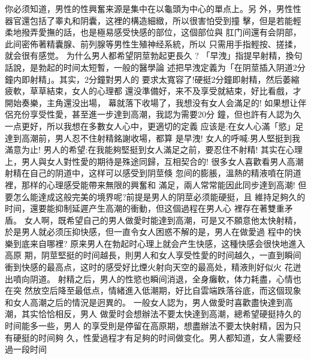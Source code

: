 \documentclass[12pt,UTF8]{ctexbook}
\begin{document}
你必须知道，男性的性興奮来源是集中在以龜頭为中心的單点上。另
外，男性性器官還包括了睾丸和阴囊，这裡的構造細緻，所以很害怕受到撞
擊，但是若能輕柔地撥弄愛撫的話，也是極易感受快感的部位，这個部位與
肛门间還有会阴部，此间密佈著精囊腺、前列腺等男性生殖神经系統，所以
只需用手指輕按、搓揉，就会很有感觉。
为什么男人都希望阴莖勃起更長久 ?
「早洩」指提早射精，換句話說，是勃起的时间太短暫，一般的醫學論
述把早洩定義为「在阴莖插入阴道2分鐘内即射精」。其实，2分鐘對男人的
要求太寬容了!硬挺2分鐘即射精，然后萎縮疲軟，草草結束，女人的心理都
還没準備好，来不及享受就結束，好比看戲，才開始奏樂，主角還没出場，
幕就落下收場了，我想没有女人会滿足的!
如果想让伴侶充份享受性愛，甚至進一步達到高潮，我認为需要20分
鐘，但也許有人認为久一点更好，所以我想在多數女人心中，更適切的定義
应该是:在女人心滿「慾」足達到高潮前，男人忍不住射精銘謝收場，都算
是早洩!
女人的呼喊:男人堅挺到我滿意为止!
男人的希望:在我能夠堅挺到女人滿足之前，要忍住不射精!
其实在心理上，男人與女人對性愛的期待是殊途同歸，互相契合的!
很多女人喜歡看男人高潮射精在自己的阴道中，这样可以感受到阴莖倏
忽间的膨脹，溫熱的精液噴在阴道裡，那样的心理感受能帶来無限的興奮和
滿足，兩人常常能因此同步達到高潮!
但要怎么能達成这般完美的境界呢?前提是男人的阴莖必须能硬挺，且
維持足夠久的时间，還要能抑制延遲产生高潮的衝動，但这個過程在男人心
裡存在著雙重矛盾。
女人啊，既希望自己的男人做愛时能達到高潮，可是又不願意他太快射精，於是男人就必须压抑快感，但一直令女人困惑不解的是，男人在做愛過
程中的快樂到底来自哪裡?
原来男人在勃起时心理上就会产生快感，这種快感会很快地進入高原
期，阴莖堅挺的时间越長，則男人和女人享受性愛的时间越久，一直到瞬间
衝到快感的最高点，这时的感受好比煙火射向天空的最高处，精液則好似火
花迸出噴向阴道。
射精之后，男人的性慾也瞬间消退，全身癱軟，体力耗盡，心情也在突
然放空后降至最低点，情緒進入低潮期，好比自雲端跌落谷底，而这個现象
和女人高潮之后的情況是迥異的。
一般女人認为，男人做愛时喜歡盡快達到高潮，其实恰恰相反，男人
做愛时会想辦法不要太快達到高潮，總希望硬挺持久的时间能多一些，男人
的享受則是停留在高原期，想盡辦法不要太快射精，因为只有硬挺的时间夠
久，性愛過程才有足夠的时间做变化。男人都知道，女人需要经過一段时间
\end{document}
